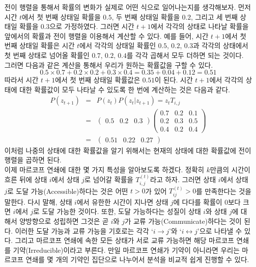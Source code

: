 \documentclass[a4paper]{oblivoir}
\begin{document}
전이 행렬을 통해서 확률의 변화가 실제로 어떤 식으로 일어나는지를 생각해보자. 먼저 시간 $t$에서 첫 번째 상태일 확률을 $0.5$, 두 번째 상태일 확률을 $0.2$, 그리고 세 번째 상태일 확률을 $0.3$으로 가정하였다. 그러면 시간 $t+1$에서 각각의 상태로 나타날 확률을 앞에서의 확률과 전이 행렬을 이용해서 계산할 수 있다. 예를 들어, 시간 $t+1$에서 첫 번째 상태일 확률은 시간 $t$에서 각각의 상태일 확률인 $0.5$, $0.2$, $0.3$과 각각의 상태에서 첫 번째 상태로 넘어올 확률인 $0.7$, $0.2$, $0.4$를 각각 곱해서 모두 더하면 되는 것이다. 그러면 다음과 같은 계산을 통해서 우리가 원하는 확률값을 구할 수 있다.
\begin{equation}
0.5 \times 0.7 + 0.2 \times 0.2 + 0.3 \times 0.4 = 0.35 + 0.04 + 0.12 = 0.51
\label{eq:10-4}
\end{equation} 
따라서 시간 $t+1$에서 첫 번째 상태일 확률값은 $0.51$이 된다. 시간 $t+1$에서 각각의 상태에 대한 확률값이 모두 나타날 수 있도록 한 번에 계산하는 것은 다음과 같다.  
\begin{eqnarray}
P(z_{t+1}) & = & P(z_{t})P(z_{t}|z_{t+1}) = z_{t} T_{i,j} \nonumber \\
& = & \left( \begin{array}{ccc} 0.5 & 0.2 & 0.3 \end{array} \right) \left( \begin{array}{ccc} 0.7 & 0.2 & 0.1 \\ 0.2 & 0.3 & 0.5 \\ 0.4 & 0.2 & 0.4 \end{array} \right)  \nonumber \\
& = & \left( \begin{array}{ccc} 0.51 & 0.22 & 0.27 \end{array} \right) \label{eq:10-5}
\end{eqnarray} 
이처럼 나중의 상태에 대한 확률값을 알기 위해서는 현재의 상태에 대한 확률값에 전이 행렬을 곱하면 된다. \\

이제 마르코프 연쇄에 대한 몇 가지 특성을 알아보도록 하겠다. 정확히 $k$만큼의 시간이 흐른 뒤에 상태 $i$에서 상태 $j$로 넘어갈 확률을 $T_{i,j}^{(t)}$라고 하자. 그러면 상태 $i$에서 상태 $j$로 도달 가능(Accessible)하다는 것은 어떤 $t>0$가 있어 $T_{ij}^{(t)}>0$를 만족한다는 것을 말한다. 다시 말해, 상태 $i$에서 유한한 시간이 지나면 상태 $j$에 다다를 확률이 0보다 크면 $i$에서 $j$로 도달 가능한 것이다.  또한, 도달 가능하다는 성질이 상태 $i$와 상태 $j$에 대해서 양방향으로 성립하면 그것은 곧 $i$와 $j$가 교류 가능(Communicate)하다는 것이 된다. 이러한 도달 가능과 교류 가능을 기호로는 각각 `$i \to j$'와 `$i \leftrightarrow j$'으로 나타낼 수 있다. 그리고 마르코프 연쇄에 속한 모든 상태가 서로 교류 가능하면 해당 마르코프 연쇄를 기약(Irreducible)이라고 부른다. 만일 마르코프 연쇄가 기약이 아니라면 우리는 마르코프 연쇄를 몇 개의 기약인 집단으로 나누어서 분석을 비교적 쉽게 진행할 수 있다. \\
\end{document}

